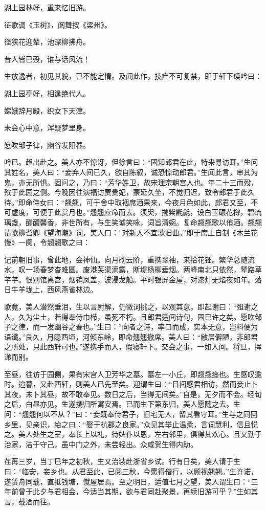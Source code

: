 \documentclass[a4paper,12pt,UTF8,twoside]{ctexbook}
\begin{document}
湖上园林好，重来忆旧游。

征歌调《玉树》，阅舞按《梁州》。

径狭花迎辇，池深柳拂舟。

昔人皆已殁，谁与话风流！

生放逸者，初见其貌，已不能定情。及闻此作，技痒不可复禁，即于轩下续吟曰：

湖上园亭好，相逢绝代人。

嫦娥辞月殿，织女下天津。

未会心中意，浑疑梦里身。

愿吹邹子律，幽谷发阳春。

吟已。趋出赴之。美人亦不惊讶，但徐言曰：“固知郎君在此，特来寻访耳。”生问其姓名，美人曰：“妾弃人间已久，欲自陈叙，诚恐惊动郎君。”生闻此言，审其为鬼，亦无所惧。固问之，乃曰：“芳华姓卫，故宋理宗朝宫人也。年二十三而殁，殡于此园之侧。今晚因往演福访贾贵妃，蒙延久坐，不觉归迟，致令郎君于此久待。”即命侍女曰：“翘翘，可于舍中取裀席酒果来，今夜月色如此，郎君又至，不可虚度，可便于此赏月也。”翘翘应命而去。须臾，携紫氍毹，设白玉碾花樽，碧琉璃盏，醪醴馨香，非世所有，与生笑谑笑咏，词旨清婉。复命翘翘歌以侑酒。翘翘请歌柳耆卿《望海潮》词，美人曰：“对新人不宜歌旧曲。”即于席上自制《木兰花慢》一阕，令翘翘歌之曰：

记前朝旧事，曾此地，会神仙。向月砌云阶，重携翠袖，来拾花钿。繁华总随流水，叹一场春梦杳难圆。废港芙渠滴露，断堤杨柳垂烟。两峰南北只依然，辇路草芊芊。恨别馆离宫，烟销凤盖，波浸龙船。平时银屏金屋，对漆灯无焰夜如年。落日牛羊垅上，西风燕雀林边。

歌竟，美人潜然垂泪，生以言尉解，仍微词挑之，以观其意。即起谢曰：“殂谢之人，久为尘土，若得奉侍巾栉，虽死不朽。且郎君适间诗句，固已许之矣。愿吹邹子之律，而一发幽谷之春也。”生曰：“向者之诗，率口而成，实本无意，岂料便为语谶。”良久，月隐西垣，河倾东岭，即命翘翘撤席。美人曰：“敝居僻陋，非郎君之所处，只此西轩可也。”遂携手而入，假寝轩下。交会之事，一如人间。将旦，挥涕而别。

至昼，往访于园侧，果有宋宫人卫芳华之墓。墓左一小丘，即翘翘瘗也。生感叹逾时。迨暮，又赴西轩，则美人已先至矣。迎谓生曰：“日间感君相访，然而妾止卜其夜，未卜其昼，故不敢奉见。数日之后，当得无间矣。”自是，无夕而不会。经旬之后，白昼亦见。生遂携归所寓安焉。已而生下第东归，美人愿随之去。生问：“翘翘何以不从？”曰：“妾既奉侍君子，旧宅无人，留其看守耳。”生与之同回乡里，见亲识，绐之曰：“娶于杭郡之良家。”众见其举止温柔，言词慧利，信且悦之。美人处生之室，奉长上以礼，待婢仆以恩，左右邻里，俱得其欢心。且又勤于治家，洁于守己，虽中门之外，未尝轻出。众咸贺生得内助。

荏苒三岁，当丁巳年之初秋，生又治装赴浙省乡试。行有日矣，美人请于生曰：“临安，妾乡也。从君至此，已阅三秋，今愿得偕行，以顾视翘翘。”生许诺，遂赁舟同载，直抵钱塘，僦屋居焉。至之明日，适值七月之望，美人谓生曰：“三年前曾于此夕与君相会，今适当其期，欲与君同赴聚景，再续旧游可乎？”生如其言，载酒而往。
\end{document}
